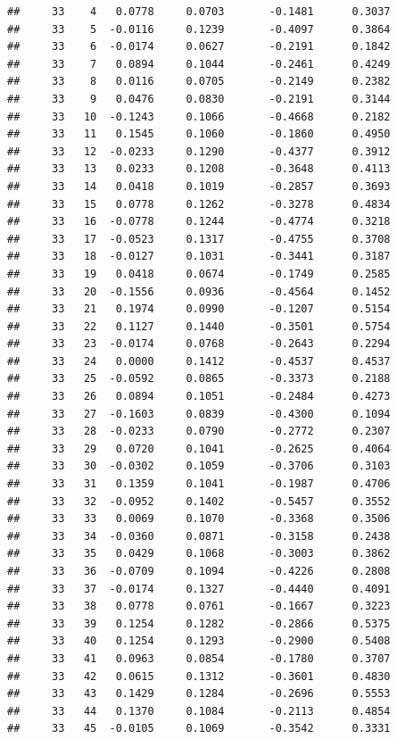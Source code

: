 \documentclass[
]{article}
\begin{document}
\begin{verbatim}
##     33    4   0.0778     0.0703       -0.1481      0.3037  
##     33    5  -0.0116     0.1239       -0.4097      0.3864  
##     33    6  -0.0174     0.0627       -0.2191      0.1842  
##     33    7   0.0894     0.1044       -0.2461      0.4249  
##     33    8   0.0116     0.0705       -0.2149      0.2382  
##     33    9   0.0476     0.0830       -0.2191      0.3144  
##     33   10  -0.1243     0.1066       -0.4668      0.2182  
##     33   11   0.1545     0.1060       -0.1860      0.4950  
##     33   12  -0.0233     0.1290       -0.4377      0.3912  
##     33   13   0.0233     0.1208       -0.3648      0.4113  
##     33   14   0.0418     0.1019       -0.2857      0.3693  
##     33   15   0.0778     0.1262       -0.3278      0.4834  
##     33   16  -0.0778     0.1244       -0.4774      0.3218  
##     33   17  -0.0523     0.1317       -0.4755      0.3708  
##     33   18  -0.0127     0.1031       -0.3441      0.3187  
##     33   19   0.0418     0.0674       -0.1749      0.2585  
##     33   20  -0.1556     0.0936       -0.4564      0.1452  
##     33   21   0.1974     0.0990       -0.1207      0.5154  
##     33   22   0.1127     0.1440       -0.3501      0.5754  
##     33   23  -0.0174     0.0768       -0.2643      0.2294  
##     33   24   0.0000     0.1412       -0.4537      0.4537  
##     33   25  -0.0592     0.0865       -0.3373      0.2188  
##     33   26   0.0894     0.1051       -0.2484      0.4273  
##     33   27  -0.1603     0.0839       -0.4300      0.1094  
##     33   28  -0.0233     0.0790       -0.2772      0.2307  
##     33   29   0.0720     0.1041       -0.2625      0.4064  
##     33   30  -0.0302     0.1059       -0.3706      0.3103  
##     33   31   0.1359     0.1041       -0.1987      0.4706  
##     33   32  -0.0952     0.1402       -0.5457      0.3552  
##     33   33   0.0069     0.1070       -0.3368      0.3506  
##     33   34  -0.0360     0.0871       -0.3158      0.2438  
##     33   35   0.0429     0.1068       -0.3003      0.3862  
##     33   36  -0.0709     0.1094       -0.4226      0.2808  
##     33   37  -0.0174     0.1327       -0.4440      0.4091  
##     33   38   0.0778     0.0761       -0.1667      0.3223  
##     33   39   0.1254     0.1282       -0.2866      0.5375  
##     33   40   0.1254     0.1293       -0.2900      0.5408  
##     33   41   0.0963     0.0854       -0.1780      0.3707  
##     33   42   0.0615     0.1312       -0.3601      0.4830  
##     33   43   0.1429     0.1284       -0.2696      0.5553  
##     33   44   0.1370     0.1084       -0.2113      0.4854  
##     33   45  -0.0105     0.1069       -0.3542      0.3331  

\end{verbatim}
\end{document}
